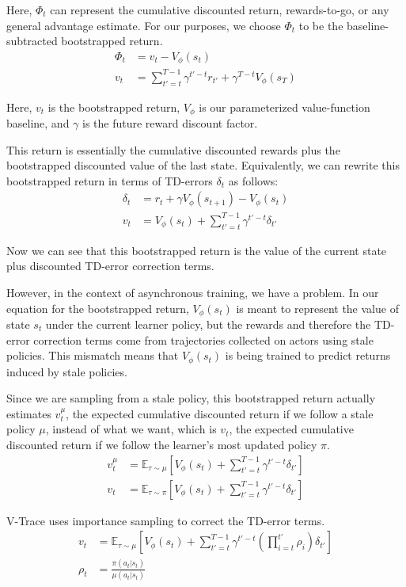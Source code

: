 \documentclass{article}
\begin{document}
Here, $\Phi_t$ can represent the cumulative discounted return, rewards-to-go, or any general advantage estimate.
For our purposes, we choose $\Phi_t$ to be the baseline-subtracted bootstrapped return.
\begin{align*}
    \Phi_t &= v_t - V_\phi(s_t) \\
    v_t &= \sum_{t'=t}^{T-1} \gamma^{t'-t} r_{t'} + \gamma^{T-t} V_\phi(s_T)
\end{align*}

Here, $v_t$ is the bootstrapped return, $V_\phi$ is our parameterized value-function baseline,
and $\gamma$ is the future reward discount factor.

This return is essentially the cumulative discounted rewards plus the bootstrapped discounted value of the
last state. Equivalently, we can rewrite this bootstrapped return in terms of TD-errors $\delta_t$
as follows:
\begin{align*}
    \delta_t &= r_t + \gamma V_\phi(s_{t+1}) - V_\phi(s_t) \\
    v_t &= V_\phi(s_t) + \sum_{t'=t}^{T-1} \gamma^{t'-t} \delta_{t'}
\end{align*}

Now we can see that this bootstrapped return is the value of the current state plus discounted TD-error
correction terms.

However, in the context of asynchronous training, we have a problem. In our equation for the bootstrapped
return, $V_\phi(s_t)$ is meant to represent the value of state $s_t$ under the current learner policy, but the
rewards and therefore the TD-error correction terms come from trajectories collected on actors using stale
policies. This mismatch means that $V_\phi(s_t)$ is being trained to predict returns induced by stale policies.

Since we are sampling from a stale policy, this bootstrapped return actually estimates $v^\mu_t$, the expected
cumulative discounted return if we follow a stale policy $\mu$, instead of what we want, which is $v_t$,
the expected cumulative discounted return if we follow the learner's most updated policy $\pi$.
\begin{align*}
v^\mu_t &= \mathbb{E}_{\tau \sim \mu} \left[ V_\phi(s_t) + \sum_{t'=t}^{T-1} \gamma^{t'-t} \delta_{t'} \right] \\
v_t &= \mathbb{E}_{\tau \sim \pi} \left[ V_\phi(s_t) + \sum_{t'=t}^{T-1} \gamma^{t'-t} \delta_{t'} \right]
\end{align*}

V-Trace uses importance sampling to correct the TD-error terms.
\begin{align*}
v_t &= \mathbb{E}_{\tau \sim \mu} \left[ V_\phi(s_t) + \sum_{t'=t}^{T-1} \gamma^{t'-t}
\left( \prod_{i=t}^{t'} \rho_i \right)
\delta_{t'} \right] \\
\rho_t &= \frac{\pi(a_t|s_t)}{\mu(a_t|s_t)}
\end{align*}
\end{document}

